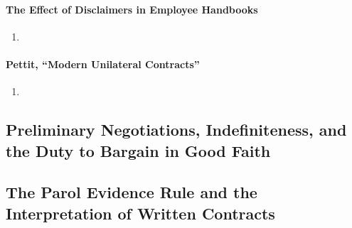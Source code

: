 \paragraph{The Effect of Disclaimers in Employee Handbooks}

\begin{enumerate}
    \item %
\end{enumerate}

\paragraph{Pettit, ``Modern Unilateral Contracts''}

\begin{enumerate}
    \item %
\end{enumerate}

\subsection{Preliminary Negotiations, Indefiniteness, and the Duty to Bargain 
in Good Faith}


\subsection{The Parol Evidence Rule and the Interpretation of Written 
Contracts}


